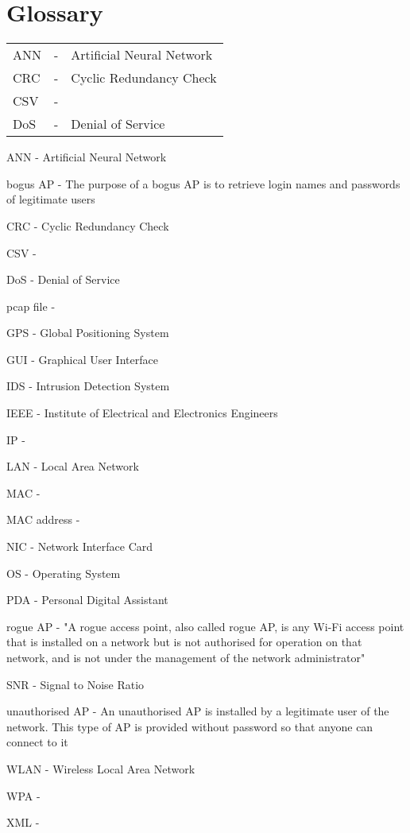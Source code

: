 \chapter{Glossary}

\begin{table}[htbp]
	\begin{center}
		\begin{tabular}{p{170pt}|p{50pt}|p{170pt}|}
		ANN&-&Artificial Neural Network\\
		CRC&-&Cyclic Redundancy Check\\
		CSV&-&\\
		DoS&-&Denial of Service\\
		\end{tabular}
	\end{center}
\end{table}

ANN - Artificial Neural Network

bogus AP - The purpose of a bogus AP is to retrieve login names and passwords of legitimate users

CRC - Cyclic Redundancy Check

CSV -

DoS - Denial of Service

pcap file - 

GPS - Global Positioning System

GUI - Graphical User Interface

IDS - Intrusion Detection System

IEEE - Institute of Electrical and Electronics Engineers

IP -

LAN - Local Area Network

MAC -

MAC address - 

NIC - Network Interface Card

OS - Operating System

PDA - Personal Digital Assistant

rogue AP - "A rogue access point, also called rogue AP, is any Wi-Fi access point that is installed on a network but is not authorised for operation on that network, and is not under the management of  the network administrator" \cite{rogue_AP}

SNR - Signal to Noise Ratio

unauthorised AP - An unauthorised AP is installed by a legitimate user of the network. This type of AP is provided without password so that anyone can connect to it

WLAN - Wireless Local Area Network

WPA -

XML - 
